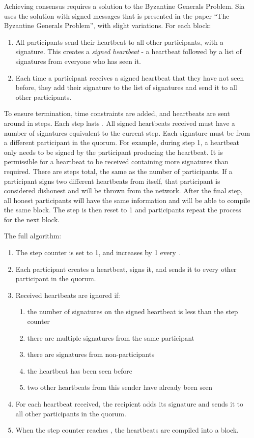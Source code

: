 \documentclass[twocolumn]{article}
\begin{document}
Achieving consensus requires a solution to the Byzantine Generals Problem.
Sia uses the solution with signed messages that is presented in the paper ``The Byzantine Generals Problem'', with slight variations. %
For each block:
\begin{enumerate}
	\item All participants send their heartbeat to all other participants, with a signature.
	This creates a \textit{signed heartbeat} - a heartbeat followed by a list of signatures from everyone who has seen it.
	\item Each time a participant receives a signed heartbeat that they have not seen before, they add their signature to the list of signatures and send it to all other participants.
\end{enumerate}
To ensure termination, time constraints are added, and heartbeats are sent around in steps.
Each step lasts \stepduration{}.
All signed heartbeats received must have a number of signatures equivalent to the current step.
Each signature must be from a different participant in the quorum.
For example, during step 1, a heartbeat only needs to be signed by the participant producing the heartbeat.
It is permissible for a heartbeat to be received containing more signatures than required.
There are \quorumsize{} steps total, the same as the number of participants.
If a participant signs two different heartbeats from itself, that participant is considered dishonest and will be thrown from the network.
After the final step, all honest participants will have the same information and will be able to compile the same block.
The step is then reset to 1 and participants repeat the process for the next block.
\vfill\break

The full algorithm:
\begin{enumerate}
	\item The step counter is set to 1, and increases by 1 every \stepduration{}.
	\item Each participant creates a heartbeat, signs it, and sends it to every other participant in the quorum.
	\item Received heartbeats are ignored if:
	\begin{enumerate}
		\item the number of signatures on the signed heartbeat is less than the step counter
		\item there are multiple signatures from the same participant
		\item there are signatures from non-participants
		\item the heartbeat has been seen before
		\item two other heartbeats from this sender have already been seen
	\end{enumerate}
	\item For each heartbeat received, the recipient adds its signature and sends it to all other participants in the quorum.
	\item When the step counter reaches \quorumsize{}, the heartbeats are compiled into a block.
\end{enumerate}
\end{document}
